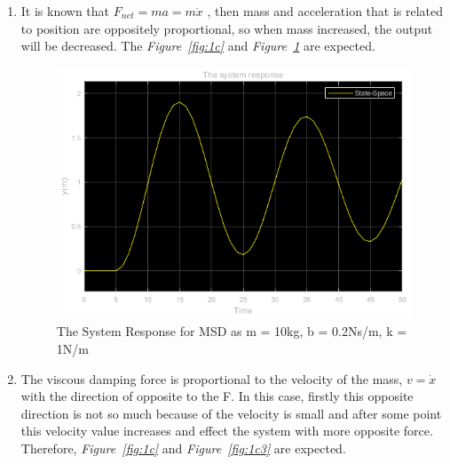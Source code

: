 \documentclass[a4paper,12pt]{article}
\begin{document}
\begin{enumerate}
\begin{enumerate}
\begin{enumerate}
			
			
			\item It is known that $F_{net}=ma=m\ddot{x} $ , then mass and acceleration that is related to position are oppositely proportional, so when mass increased, the output will be decreased. The \textit{Figure~\ref{fig:1c}} and \textit{Figure~\ref{fig:1c2}} are expected.
			
			\begin{figure}[H]
				\center
				\setlength{\unitlength}{\textwidth} 
				\includegraphics[width=0.8\unitlength]{images/1c2ey}
				\caption{\label{fig:1c2} The System Response for MSD as m = 10kg, b = 0.2Ns/m, k = 1N/m }
			\end{figure}
			
			\item  The viscous damping force is proportional to the velocity of the mass, $v=\dot{x}$ with the direction of opposite to the F. In this case, firstly this opposite direction is not so much because of the velocity is small and after some point this velocity value increases and effect the system with more opposite force. Therefore, \textit{Figure~\ref{fig:1c}} and \textit{Figure~\ref{fig:1c3}} are expected.
			

\end{enumerate}
\end{enumerate}
\end{enumerate}
\end{document}
